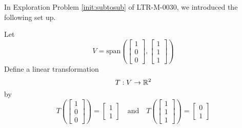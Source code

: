 \documentclass{ximera}
\begin{document}
\begin{example}\label{ex:inversematrixoftransform}
In Exploration Problem \ref{init:subtosub} of LTR-M-0030, we introduced the following set up.

Let $$V=\text{span}\left(\begin{bmatrix}1\\0\\0\end{bmatrix}, \begin{bmatrix}1\\1\\1\end{bmatrix}\right)$$
Define a linear transformation $$T:V\rightarrow \mathbb{R}^2$$
by $$T\left(\begin{bmatrix}1\\0\\0\end{bmatrix}\right)=\begin{bmatrix}1\\1\end{bmatrix}\quad \text{and} \quad T\left(\begin{bmatrix}1\\1\\1\end{bmatrix}\right)=\begin{bmatrix}0\\1\end{bmatrix}$$


\end{example}
\end{document}
